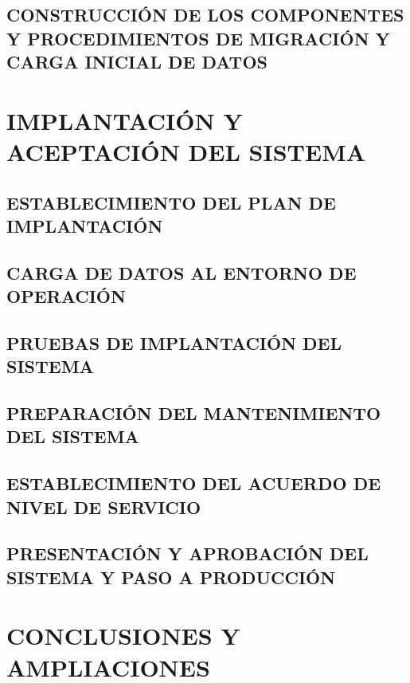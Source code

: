 \documentclass[11pt]{report}
\begin{document}
\newpage
\section{CONSTRUCCIÓN DE LOS COMPONENTES Y PROCEDIMIENTOS DE MIGRACIÓN Y CARGA INICIAL DE DATOS}



\newpage
\chapter{IMPLANTACIÓN Y ACEPTACIÓN DEL SISTEMA}
\noindent{}

\newpage

\section{ESTABLECIMIENTO DEL PLAN DE IMPLANTACIÓN}


\newpage
\section{CARGA DE DATOS AL ENTORNO DE OPERACIÓN}


\newpage
\section{PRUEBAS DE IMPLANTACIÓN DEL SISTEMA}


\newpage
\section{PREPARACIÓN DEL MANTENIMIENTO DEL SISTEMA}


\newpage
\section{ESTABLECIMIENTO DEL ACUERDO DE NIVEL DE SERVICIO}


\newpage
\section{PRESENTACIÓN Y APROBACIÓN DEL SISTEMA Y PASO A PRODUCCIÓN}


\newpage
\chapter{CONCLUSIONES Y AMPLIACIONES}
\noindent{}
\newpage
\end{document}
